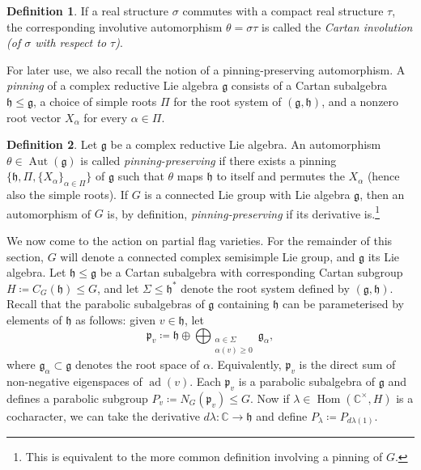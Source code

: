 \documentclass{amsart}
\newcommand{\ad}{\operatorname{ad}}
\newcommand{\Aut}{\operatorname{Aut}}
\newcommand{\C}{\mathbb{C}}
\newcommand{\g}{\mathfrak{g}}
\newcommand{\h}{\mathfrak{h}}
\newcommand{\Hom}{\operatorname{Hom}}
\newcommand{\p}{\mathfrak{p}}
\theoremstyle{definition}
\newtheorem{defn}{Definition}[section]
\theoremstyle{plain}
\theoremstyle{remark}
\begin{document}
\begin{defn}
\label{def:Cartan_involution}
    If a real structure $\sigma$ commutes with a compact real structure $\tau$, the corresponding involutive automorphism $\theta = \sigma\tau$ is called the \emph{Cartan involution (of $\sigma$ with respect to $\tau$)}.
\end{defn}

For later use, we also recall the notion of a pinning-preserving automorphism. A \emph{pinning} of a complex reductive Lie algebra $\g$ consists of a Cartan subalgebra $\h\le \g$, a choice of simple roots $\Pi$ for the root system of $(\g,\h)$, and a nonzero root vector $X_\alpha$ for every $\alpha \in \Pi$. 
\begin{defn}
\label{def:pinning}
    Let $\g$ be a complex reductive Lie algebra. An automorphism $\theta\in \Aut(\g)$ is called \emph{pinning-preserving} if there exists a pinning $\{\h, \Pi, \{X_\alpha\}_{\alpha \in \Pi}\}$ of $\g$ such that $\theta$ maps $\h$ to itself and permutes the $X_\alpha$ (hence also the simple roots). If $G$ is a connected Lie group with Lie algebra $\g$, then an automorphism of $G$ is, by definition, \emph{pinning-preserving} if its derivative is.\footnote{This is equivalent to the more common definition involving a pinning of $G$.}
\end{defn}

We now come to the action on partial flag varieties. For the remainder of this section, $G$ will denote a connected complex semisimple Lie group, and $\g$ its Lie algebra. Let $\h\le \g$ be a Cartan subalgebra with corresponding Cartan subgroup $H\coloneqq C_G(\h)\le G$, and let $\Sigma\le \h^*$ denote the root system defined by $(\g,\h)$. Recall that the parabolic subalgebras of $\g$ containing $\h$ can be parameterised by elements of $\h$ as follows: given $v\in \h$, let
$$
    \p_v \coloneqq \h \oplus \!\bigoplus_{\substack{\alpha \in \Sigma\\\alpha(v) \ge 0}} \g_\alpha,
$$
where $\g_\alpha \subset \g$ denotes the root space of $\alpha$. Equivalently, $\p_v$ is the direct sum of non-negative eigenspaces of $\ad(v)$. Each $\p_v$ is a parabolic subalgebra of $\g$ and defines a parabolic subgroup $P_v \coloneqq N_G(\p_v) \le G$. Now if $\lambda\in \Hom(\C^\times, H)$ is a cocharacter, we can take the derivative $d\lambda\colon \C\to \h$ and define
$
    P_\lambda \coloneqq P_{d\lambda(1)}.
$
\end{document}
